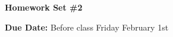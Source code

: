 
\usepackage{braket}

\def\ketY{\ensuremath{\ket {\Psi}}}
\def\iGeV{\ensuremath{\textrm{GeV}^{-1}}}
\def\mp{\ensuremath{m_{\textrm{proton}}}}
\def\rp{\ensuremath{r_{\textrm{proton}}}}
\def\me{\ensuremath{m_{\textrm{electron}}}}
\def\aG{\ensuremath{\alpha_G}}
\def\rAtom{\ensuremath{r_{\textrm{atom}}}}
\def\rNucl{\ensuremath{r_{\textrm{nucleus}}}}
\def\GN{\ensuremath{\textrm{G}_\textrm{N}}}

\def\be{\begin{equation*}}
\def\ee{\end{equation*}}


\usepackage{fancyhdr}

\fancyhf{}

\thispagestyle{fancy}






\begin{center}
{\huge \textbf{Homework Set \#2}}
\large

{\textbf{ Due Date:} Before class Friday February 1st  }
\end{center}

